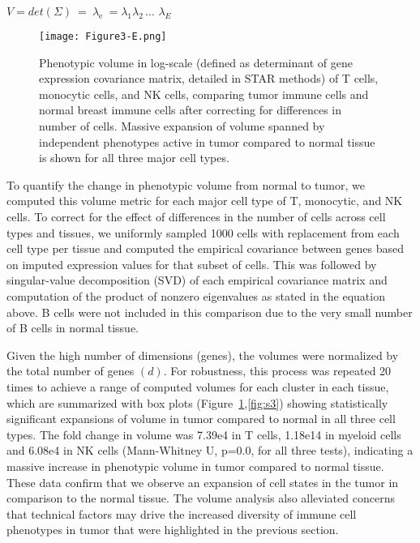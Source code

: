 \(V = det(\Sigma)\  = \ \lambda_{\text{e\ }} = \lambda_{1}\lambda_{2\ }\text{\ldots\ }\lambda_{E}\)

\begin{figure}
\centering
\texttt{[image: Figure3-E.png]}
\caption{Phenotypic volume in log-scale (defined as determinant of gene expression covariance matrix, detailed in STAR methods) of T cells, monocytic cells, and NK cells, comparing tumor immune cells and normal breast immune cells after correcting for differences in number of cells.
  Massive expansion of volume spanned by independent phenotypes active in tumor compared to normal tissue is shown for all three major cell types.
}
\label{fig:3e}
\end{figure}

To quantify the change in phenotypic volume from normal to tumor, we computed this volume metric for each major cell type of T, monocytic, and NK cells.
To correct for the effect of differences in the number of cells across cell types and tissues, we uniformly sampled 1000 cells with replacement from each cell type per tissue and computed the empirical covariance between genes based on imputed expression values for that subset of cells.
This was followed by singular-value decomposition (SVD) of each empirical covariance matrix and computation of the product of nonzero eigenvalues as stated in the equation above.
B cells were not included in this comparison due to the very small number of B cells in normal tissue.

Given the high number of dimensions (genes), the volumes were normalized by the total number of genes \((d)\). %
For robustness, this process was repeated 20 times to achieve a range of computed volumes for each cluster in each tissue, which are summarized with box plots (Figure~\ref{fig:3e},\ref{fig:s3}) showing statistically significant expansions of volume in tumor compared to normal in all three cell types.
The fold change in volume was 7.39e4 in T cells, 1.18e14 in myeloid cells and 6.08e4 in NK cells (Mann-Whitney U, p=0.0, for all three tests), indicating a massive increase in phenotypic volume in tumor compared to normal tissue.
These data confirm that we observe an expansion of cell states in the tumor in comparison to the normal tissue. 
The volume analysis also alleviated concerns that technical factors may drive the increased diversity of immune cell phenotypes in tumor that were highlighted in the previous section.


